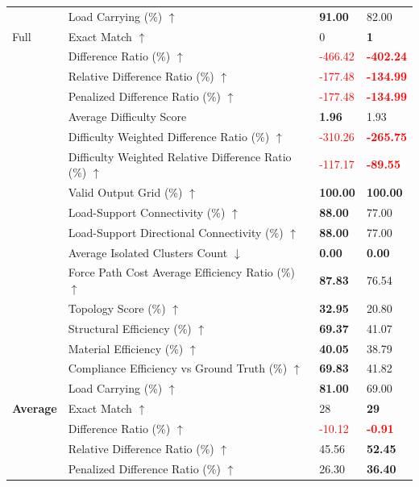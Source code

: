 \begin{table}[!h]
{\begin{tabular}{llll}
 & Load Carrying (\%) $\uparrow$ & \textbf{91.00} & 82.00 \\
Full & Exact Match $\uparrow$ & 0 & \textbf{1} \\
 & Difference Ratio (\%) $\uparrow$ & \textcolor{red}{-466.42} & \textbf{\textcolor{red}{-402.24}} \\
 & Relative Difference Ratio (\%) $\uparrow$ & \textcolor{red}{-177.48} & \textbf{\textcolor{red}{-134.99}} \\
 & Penalized Difference Ratio (\%) $\uparrow$ & \textcolor{red}{-177.48} & \textbf{\textcolor{red}{-134.99}} \\
 & Average Difficulty Score & \textbf{1.96} & 1.93 \\
 & Difficulty Weighted Difference Ratio (\%) $\uparrow$ & \textcolor{red}{-310.26} & \textbf{\textcolor{red}{-265.75}} \\
 & Difficulty Weighted Relative Difference Ratio (\%) $\uparrow$ & \textcolor{red}{-117.17} & \textbf{\textcolor{red}{-89.55}} \\
 & Valid Output Grid (\%) $\uparrow$ & \textbf{100.00} & \textbf{100.00} \\
 & Load-Support Connectivity (\%) $\uparrow$ & \textbf{88.00} & 77.00 \\
 & Load-Support Directional Connectivity (\%) $\uparrow$ & \textbf{88.00} & 77.00 \\
 & Average Isolated Clusters Count $\downarrow$ & \textbf{0.00} & \textbf{0.00} \\
 & Force Path Cost Average Efficiency Ratio (\%) $\uparrow$ & \textbf{87.83} & 76.54 \\
 & Topology Score (\%) $\uparrow$ & \textbf{32.95} & 20.80 \\
 & Structural Efficiency (\%) $\uparrow$ & \textbf{69.37} & 41.07 \\
 & Material Efficiency (\%) $\uparrow$ & \textbf{40.05} & 38.79 \\
 & Compliance Efficiency vs Ground Truth (\%) $\uparrow$ & \textbf{69.83} & 41.82 \\
 & Load Carrying (\%) $\uparrow$ & \textbf{81.00} & 69.00 \\
\midrule
\textbf{Average} & Exact Match $\uparrow$ & 28 & \textbf{29} \\
 & Difference Ratio (\%) $\uparrow$ & \textcolor{red}{-10.12} & \textbf{\textcolor{red}{-0.91}} \\
 & Relative Difference Ratio (\%) $\uparrow$ & 45.56 & \textbf{52.45} \\
 & Penalized Difference Ratio (\%) $\uparrow$ & 26.30 & \textbf{36.40} \\

\end{tabular}}
\end{table}
